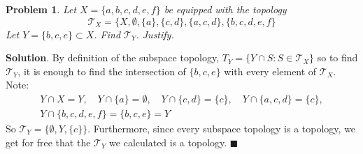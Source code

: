 \documentclass[12pt]{article}
\renewcommand{\=}[1]{\stackrel{#1}{=}} %
\providecommand{\T}{\mathcal{T}}
\newtheorem{p}{Problem}[section]
\theoremstyle{definition}
\newenvironment{s}{%
        \begin{trivlist} \item \textbf{Solution}. }{%
            \hspace*{\fill} $\blacksquare$\end{trivlist}}%
\begin{document}
\begin{p}
    Let $X = \{a,b,c,d,e,f\}$ be equipped with the topology
    \[ \T_X = \{X,\emptyset,\{a\},\{c,d\},\{a,c,d\},\{b,c,d,e,f\} \]
    Let $Y = \{b,c,e\} \subset X$. Find $\T_Y$. Justify.
\end{p}
\begin{s}
    By definition of the subspace topology, 
    $T_Y = \{Y\cap S: S\in \T_X\}$ so to find $\T_Y$, it is enough to find the intersection of $\{b,c,e\}$ with every element
    of $\T_X$. Note:
    \begin{align*}
        Y \cap X = Y, \quad Y \cap \{a\} = \emptyset, \quad Y \cap \{c,d\} = \{c\}, \quad Y \cap \{a,c,d\} = \{c\}, \\
        Y \cap \{b,c,d,e,f\} = \{b,c,e\} = Y
    \end{align*}
    So $\T_Y = \{\emptyset, Y, \{c\}\}$. Furthermore, since every subspace
    topology is a topology, we get for free that the $\T_Y$ we calculated is a topology.
\end{s}

\newpage
\end{document}
